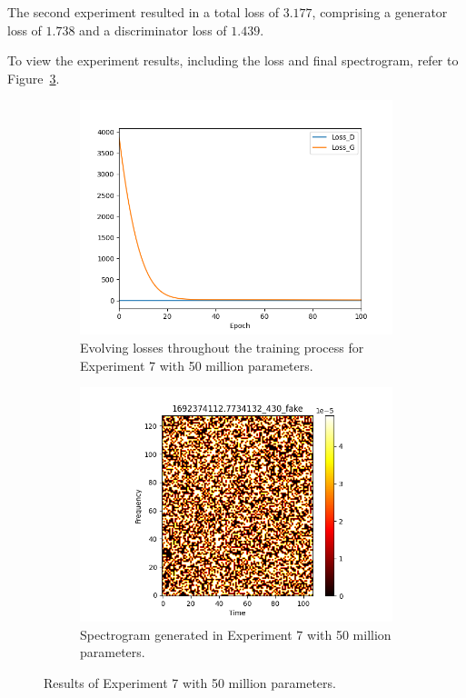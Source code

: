 The second experiment resulted in a total loss of $3.177$, comprising a generator loss of $1.738$ and a discriminator loss of $1.439$.

To view the experiment results, including the loss and final spectrogram, refer to Figure~\ref{fig:exp7_25_results}.

\begin{figure}[!ht]
    \centering
    \begin{subfigure}{0.45\textwidth}
        \includegraphics[width=\textwidth]{figures/4.5-results/exp7_25_loss.png}
        \caption{Evolving losses throughout the training process for Experiment 7 with 50 million parameters.}
        \label{fig:exp7_25_loss}
    \end{subfigure}
    \begin{subfigure}{0.45\textwidth}
        \includegraphics[width=\textwidth]{figures/4.5-results/exp7_25_spectrogram.png}
        \caption{Spectrogram generated in Experiment 7 with 50 million parameters.}
        \label{fig:exp7_25_spectrogram}
    \end{subfigure}
    \caption{Results of Experiment 7 with 50 million parameters.}
    \label{fig:exp7_25_results}
\end{figure}

